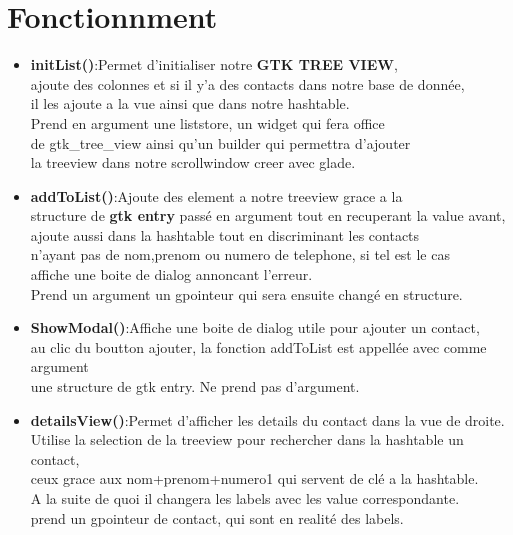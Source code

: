 \documentclass[a4paper, 11pt]{article}
\begin{document}
\section{Fonctionnment}
\begin{itemize}[label=\textbullet, font=\normalsize]

\item{\bf initList()}:Permet d'initialiser notre {\bf GTK TREE VIEW},\\
 ajoute des colonnes et si il y'a des contacts dans notre base de donnée,\\
  il les ajoute a la vue ainsi que dans notre hashtable.\\
Prend en argument une liststore, un widget qui fera office\\ 
de gtk_tree_view ainsi qu'un builder qui permettra d'ajouter\\ 
la treeview dans notre scrollwindow creer avec glade.\\

\item{\bf addToList()}:Ajoute des element a notre treeview grace a la\\ 
structure de {\bf gtk entry} passé en argument tout en recuperant la value avant, \\
ajoute aussi dans la hashtable tout en discriminant les contacts \\
n'ayant pas de nom,prenom ou numero de telephone, si tel est le cas\\ 
affiche une boite de dialog annoncant l'erreur.\\
Prend un argument un gpointeur qui sera ensuite changé en structure.\\
 
\item{\bf ShowModal()}:Affiche une boite de dialog utile pour ajouter un contact,\\
au clic du boutton ajouter, la fonction addToList est appellée avec comme argument\\
une structure de gtk entry.
Ne prend pas d'argument.
\item{\bf detailsView()}:Permet d'afficher les details du contact dans la vue de droite.\\
Utilise la selection de la treeview pour rechercher dans la hashtable un contact, \\
ceux grace aux nom+prenom+numero1 qui servent de clé a la hashtable.\\
A la suite de quoi il changera les labels avec les value correspondante.\\
prend un gpointeur de contact, qui sont en realité des labels.\\


\end{itemize}
\end{document}
